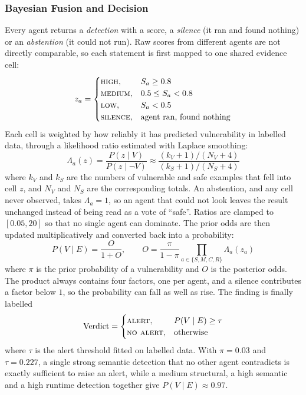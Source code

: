 \documentclass[conference]{IEEEtran}
\begin{document}
\subsubsection{Bayesian Fusion and Decision}
Every agent returns a \emph{detection} with a score, a \emph{silence} (it
ran and found nothing) or an \emph{abstention} (it could not run). Raw
scores from different agents are not directly comparable, so each statement
is first mapped to one shared evidence cell:
\begin{equation}
z_a=
\begin{cases}
\textsc{high}, & S_a \ge 0.8\\
\textsc{medium}, & 0.5 \le S_a < 0.8\\
\textsc{low}, & S_a < 0.5\\
\textsc{silence}, & \text{agent ran, found nothing}
\end{cases}
\label{eq:cell}
\end{equation}
Each cell is weighted by how reliably it has predicted vulnerability in
labelled data, through a likelihood ratio estimated with Laplace smoothing:
\begin{equation}
\Lambda_a(z)=\frac{P(z\mid V)}{P(z\mid\neg V)}\approx
\frac{(k_V+1)/(N_V+4)}{(k_S+1)/(N_S+4)}
\label{eq:lr}
\end{equation}
where $k_V$ and $k_S$ are the numbers of vulnerable and safe examples that
fell into cell $z$, and $N_V$ and $N_S$ are the corresponding totals. An
abstention, and any cell never observed, takes $\Lambda_a=1$, so an agent
that could not look leaves the result unchanged instead of being read as a
vote of ``safe''. Ratios are clamped to $[0.05,20]$ so that no single agent
can dominate. The prior odds are then updated multiplicatively and
converted back into a probability:
\begin{equation}
P(V\mid E)=\frac{O}{1+O},\qquad
O=\frac{\pi}{1-\pi}\prod_{a\in\{S,M,C,R\}}\Lambda_a(z_a)
\label{eq:post}
\end{equation}
where $\pi$ is the prior probability of a vulnerability and $O$ is the
posterior odds. The product always contains four factors, one per agent,
and a silence contributes a factor below $1$, so the probability can fall
as well as rise. The finding is finally labelled
\begin{equation}
\mathrm{Verdict}=
\begin{cases}
\textsc{alert}, & P(V\mid E)\ge\tau\\
\textsc{no alert}, & \text{otherwise}
\end{cases}
\label{eq:verdict}
\end{equation}
where $\tau$ is the alert threshold fitted on labelled data. With
$\pi=0.03$ and $\tau=0.227$, a single strong semantic detection that no
other agent contradicts is exactly sufficient to raise an alert, while a
medium structural, a high semantic and a high runtime detection together
give $P(V\mid E)\approx0.97$.
\end{document}
